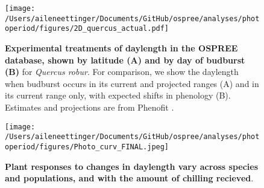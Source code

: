\documentclass{article}
\begin{document}
\begin{figure}[p]
\texttt{[image: /Users/aileneettinger/Documents/GitHub/ospree/analyses/photoperiod/figures/2D\_quercus\_actual.pdf]} 
\caption{\textbf{Experimental treatments of daylength in the OSPREE database, shown by latitude (A) and by day of budburst (B)} for \textit{Quercus robur}. For comparison, we show the daylength when budburst occurs in its current and projected ranges (A) and in its current range only, with expected shifts in phenology (B). Estimates and projections are from Phenofit \citep{duputie2015}.}
 \label{fig:quercus}
 \end{figure}
 
 \begin{figure}[p]
\texttt{[image: /Users/aileneettinger/Documents/GitHub/ospree/analyses/photoperiod/figures/Photo\_curv\_FINAL.jpeg]} 
\caption{\textbf{Plant responses to changes in daylength vary across species and populations, and with the amount of chilling recieved}.}
 \label{fig:photocurve}
 \end{figure}
\end{document}
